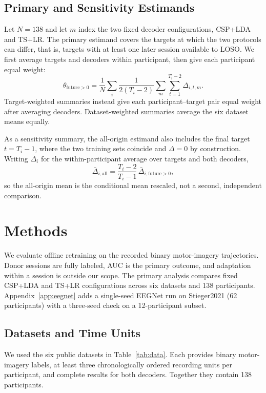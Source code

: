 \documentclass{ieeeaccess}
\begin{document}
\subsection{Primary and Sensitivity Estimands}
Let $N=138$ and let $m$ index the two fixed decoder configurations, CSP+LDA and
TS+LR. The primary estimand covers the targets at which the two protocols can
differ, that is, targets with at least one later session available to LOSO. We
first average targets and decoders within participant, then give each
participant equal weight:
\begin{equation}
\theta_{\mathrm{future}>0}=\frac{1}{N}\sum_i
\frac{1}{2(T_i-2)}\sum_m\sum_{t=1}^{T_i-2}\Delta_{i,t,m}.
\end{equation}
Target-weighted summaries instead give each participant--target pair equal
weight after averaging decoders. Dataset-weighted summaries average the six
dataset means equally.

As a sensitivity summary, the all-origin estimand also includes the final
target $t=T_i-1$, where the two training sets coincide and $\Delta=0$ by
construction. Writing $\bar\Delta_i$ for the within-participant average over
targets and both decoders,
\begin{equation}
\bar\Delta_{i,\mathrm{all}}
=\frac{T_i-2}{T_i-1}\,\bar\Delta_{i,\mathrm{future}>0},
\label{eq:zero-scaling}
\end{equation}
so the all-origin mean is the conditional mean rescaled, not a second,
independent comparison.

\section{Methods}
\label{sec:methods}
We evaluate offline retraining on the recorded binary motor-imagery
trajectories. Donor sessions are fully labeled, AUC is the primary outcome, and
adaptation within a session is outside our scope. The primary analysis compares fixed CSP+LDA and TS+LR configurations across six
datasets and 138 participants. Appendix~\ref{app:eegnet} adds a single-seed
EEGNet run on Stieger2021 (62 participants) with a three-seed check on a
12-participant subset.
\subsection{Datasets and Time Units}
We used the six public datasets in Table~\ref{tab:data}. Each provides binary
motor-imagery labels, at least three chronologically ordered recording units per
participant, and complete results for both decoders. Together they contain 138
participants.
\end{document}

